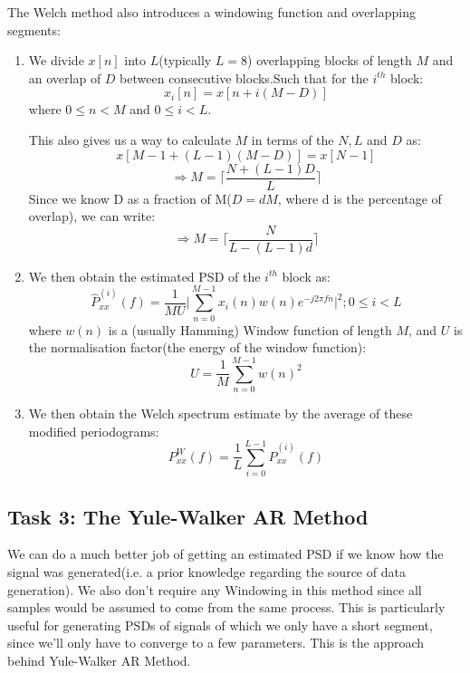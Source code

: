 \documentclass{article}
\begin{document}
The Welch method also introduces a windowing function and overlapping segments:
\begin{enumerate}
  \item We divide $x[n]$ into $L$(typically $L=8$) overlapping blocks of length $M$ and an overlap of $D$ between consecutive blocks.Such that for the $i^{th}$ block:
    \begin{equation}
      x_i[n]=x[n+i(M-D)]
    \end{equation}
    where $0\leq n< M$ and $0\leq i< L$.

    This also gives us a way to calculate $M$ in terms of the $N,L$ and $D$ as:
    \begin{equation}
      x[M-1+(L-1)(M-D)]=x[N-1]
    \end{equation}
    \begin{equation}
      \Rightarrow M=\Bigg\lceil\frac{N+(L-1)D}{L}\Bigg\rceil
    \end{equation}
    Since we know D as a fraction of M($D=dM$, where d is the percentage of overlap), we can write:
    \begin{equation}
      \Rightarrow M=\Bigg\lceil\frac{N}{L-(L-1)d}\Bigg\rceil
    \end{equation}
  \item We then obtain the estimated PSD of the $i^{th}$ block as:
    \begin{equation}
      \hat{P}_{xx}^{(i)}(f)= \frac{1}{MU}\Bigg|\sum_{n=0}^{M-1}x_i(n)w(n) e^{-j2\pi fn}\Bigg|^2; 0\leq i< L
    \end{equation}
    where $w(n)$ is a (usually Hamming) Window function of length $M$, and $U$ is the normalisation factor(the energy of the window function):
    \begin{equation}
        U=\frac{1}{M}\sum_{n=0}^{M-1}w(n)^2
    \end{equation}
  \item We then obtain the Welch spectrum estimate by the average of these modified periodograms:
    \begin{equation}
      P^{W}_{xx}(f)=\frac{1}{L}\sum_{i=0}^{L-1}\hat{P}_{xx}^{(i)}(f)
    \end{equation}
\end{enumerate}

\subsection{Task 3: The Yule-Walker AR Method}
We can do a much better job of getting an estimated PSD if we know how the signal was generated(i.e. a prior knowledge regarding the source of data generation). We also don't require any Windowing in this method since all samples would be assumed to come from the same process. This is particularly useful for generating PSDs of signals of which we only have a short segment, since we'll only have to converge to a few parameters. This is the approach behind Yule-Walker AR Method.
\end{document}
